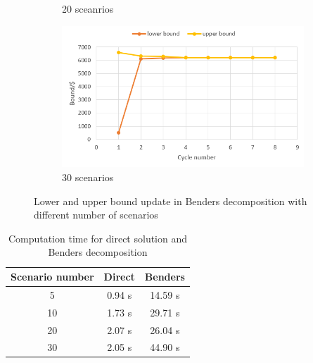 \begin{figure}
\begin{subfigure}[b]{0.475\textwidth}
            \caption[]%
            {{\small 20 sceanrios}}    
            \label{fig:mean and std of net34}
        \end{subfigure}
        \quad
        \begin{subfigure}[b]{0.475\textwidth}   
            \centering 
            \includegraphics[width=\textwidth]{figures/BOUND30.png}
            \caption[]%
            {{\small 30 scenarios}}    
            \label{fig:mean and std of net44}
        \end{subfigure}
        \caption[]
        {\small Lower and upper bound update in Benders decomposition with different number of scenarios} 
        \label{fig:mean and std of nets}
    \end{figure}

\begin{table}[h]
    \centering
    \begin{tabular}{|c|c|c|}
    \hline
     \textbf{Scenario number}    & \textbf{Direct} & \textbf{Benders} \\
         \hline
       5  & 0.94 s  & 14.59 s\\
       \hline
       10 & 1.73 s& 29.71 s\\
       \hline
       20 & 2.07 s & 26.04 s\\
         \hline
         30 & 2.05 s & 44.90 s\\
         \hline
    \end{tabular}
    \caption{Computation time for direct solution and Benders decomposition}
    \label{tab:benders}
\end{table}